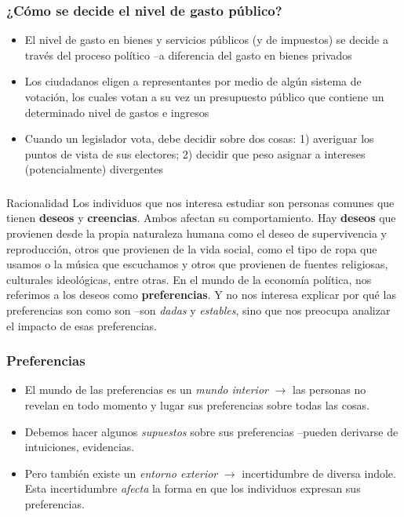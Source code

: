 \documentclass[14pt,aspectratio=169]{beamer}
\begin{document}
  \begin{frame}\frametitle{¿Cómo se decide el nivel de gasto público?}
    \begin{itemize}
    \item El nivel de gasto en bienes y servicios públicos (y de
      impuestos) se decide a través del proceso político --a
      diferencia del gasto en bienes privados
      \item Los ciudadanos eligen a representantes por medio de algún
        sistema de votación, los cuales votan a su vez un presupuesto
        público que contiene un determinado nivel de gastos e ingresos
        \item Cuando un legislador vota, debe decidir sobre dos cosas:
          1) averiguar los puntos de vista de sus electores; 2)
          decidir que peso asignar a intereses (potencialmente) divergentes
      \end{itemize}
    \end{frame}

    

\begin{frame}\frametitle{}
  \begin{block}{Racionalidad}
Los individuos que nos interesa estudiar son personas comunes que
tienen \textbf{deseos} y \textbf{creencias}. Ambos afectan su
comportamiento. Hay \textbf{deseos} que provienen desde la propia naturaleza
humana como el deseo de supervivencia y reproducción, otros que
provienen de la vida social, como el tipo de ropa que usamos o la música
que escuchamos y otros que provienen de fuentes religiosas, culturales
ideológicas, entre otras. En el mundo de la economía política, nos referimos a
los deseos como \textbf{preferencias}. Y no nos interesa explicar por
qué las preferencias son como son --son \textit{dadas} y
\textit{estables}, sino que nos preocupa analizar el impacto de esas preferencias. 
    \end{block}
  \end{frame}


\begin{frame}\frametitle{Preferencias}
  \begin{itemize}
    \item El mundo de las preferencias es un \textit{mundo interior}
    $\longrightarrow$ las personas no revelan en todo momento y lugar
    sus preferencias sobre todas las cosas.
    \item Debemos hacer algunos
    \textit{supuestos} sobre sus preferencias --pueden derivarse de
    intuiciones, evidencias.
    \item Pero también existe un \textit{entorno exterior}
      $\longrightarrow$ incertidumbre de diversa indole. Esta
      incertidumbre \textit{afecta} la forma en que los individuos
      expresan sus preferencias.  
    \end{itemize}
  \end{frame}
  
\end{document}
